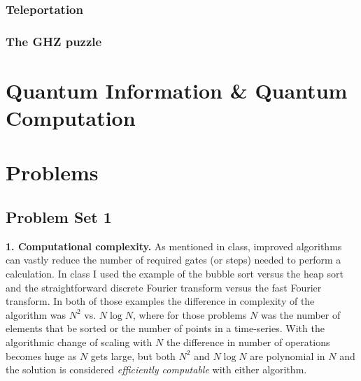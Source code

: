 \documentclass{book}
\theoremstyle{definition}
\begin{document}
\subsection{Teleportation}
\subsection{The GHZ puzzle}











\chapter{Quantum Information \& Quantum Computation}
\newpage




\chapter{Problems}

\newpage

\section{Problem Set 1}



\noindent \textbf{1. Computational complexity.}  As mentioned in class, improved algorithms can vastly reduce
the number of required gates (or steps) needed to perform a calculation. In class I used the
example of the bubble sort versus the heap sort and the straightforward discrete Fourier
transform versus the fast Fourier transform. In both of those examples the difference in
complexity of the algorithm was $N^2$ vs. $N \log N$, where for those problems $N$ was the number
of elements that be sorted or the number of points in a time-series. With the algorithmic
change of scaling with $N$ the difference in number of operations becomes huge as $N$ gets
large, but both $N^2$ and $N \log N$ are polynomial in $N$ and the solution is considered \textit{efficiently
computable} with either algorithm.
\\
\end{document}
